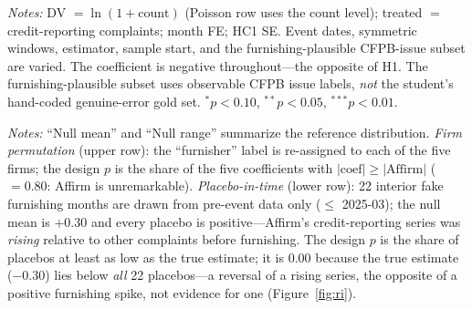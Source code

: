 \documentclass[12pt]{article}
\begin{document}
\begin{table}[htbp]\centering
\begin{threeparttable}
\caption{Robustness of the within-Affirm credit-reporting DiD}\label{tab:robust}\small

\begin{tablenotes}\small\item \textit{Notes:} DV $=\ln(1+\text{count})$ (Poisson row uses the
count level); treated $=$ credit-reporting complaints; month FE; HC1 SE. Event dates, symmetric
windows, estimator, sample start, and the furnishing-plausible CFPB-issue subset are varied. The
coefficient is negative throughout---the opposite of H1. The furnishing-plausible subset uses
observable CFPB issue labels, \emph{not} the student's hand-coded genuine-error gold set.
$^{*}p<0.10$, $^{**}p<0.05$, $^{***}p<0.01$.
\end{tablenotes}
\end{threeparttable}
\end{table}

\begin{table}[htbp]\centering
\begin{threeparttable}
\caption{Design-based inference: firm permutation and placebo-in-time}\label{tab:ri}\small

\begin{tablenotes}\small\item \textit{Notes:} ``Null mean'' and ``Null range'' summarize the
reference distribution. \emph{Firm permutation} (upper row): the ``furnisher'' label is
re-assigned to each of the five firms; the design $p$ is the share of the five coefficients with
$|\text{coef}|\geq|\text{Affirm}|$ ($=0.80$: Affirm is unremarkable). \emph{Placebo-in-time}
(lower row): 22 interior fake furnishing months are drawn from pre-event data only ($\leq$
2025-03); the null mean is $+0.30$ and every placebo is positive---Affirm's credit-reporting
series was \emph{rising} relative to other complaints before furnishing. The design $p$ is the
share of placebos at least as low as the true estimate; it is $0.00$ because the true estimate
($-0.30$) lies below \emph{all} 22 placebos---a reversal of a rising series, the opposite of a
positive furnishing spike, not evidence for one (Figure~\ref{fig:ri}).
\end{tablenotes}
\end{threeparttable}
\end{table}
\end{document}
